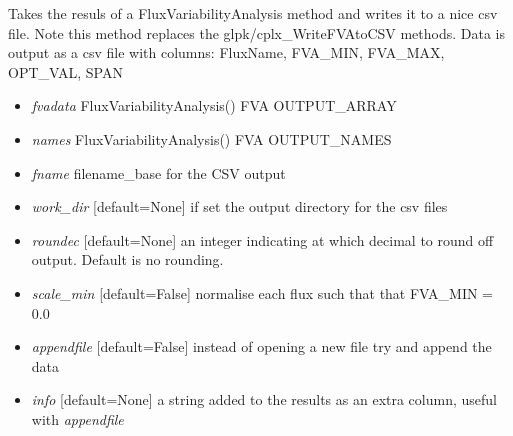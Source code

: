 \documentclass[a4paper,11pt,english]{sphinxmanual}
\begin{document}

\begin{fulllineitems}
\label{modules_doc:cbmpy.CBWrite.writeFVAdata}
Takes the resuls of a FluxVariabilityAnalysis method and writes it to a nice
csv file. Note this method replaces the glpk/cplx\_WriteFVAtoCSV methods. Data is output as a csv file
with columns: FluxName, FVA\_MIN, FVA\_MAX, OPT\_VAL, SPAN
\begin{itemize}
\item {} 
\emph{fvadata} FluxVariabilityAnalysis() FVA OUTPUT\_ARRAY

\item {} 
\emph{names} FluxVariabilityAnalysis() FVA OUTPUT\_NAMES

\item {} 
\emph{fname} filename\_base for the CSV output

\item {} 
\emph{work\_dir} {[}default=None{]} if set the output directory for the csv files

\item {} 
\emph{roundec} {[}default=None{]} an integer indicating at which decimal to round off output. Default is no rounding.

\item {} 
\emph{scale\_min} {[}default=False{]} normalise each flux such that that FVA\_MIN = 0.0

\item {} 
\emph{appendfile} {[}default=False{]} instead of opening a new file try and append the data

\item {} 
\emph{info} {[}default=None{]} a string added to the results as an extra column, useful with \emph{appendfile}

\end{itemize}

\end{fulllineitems}

\end{document}

